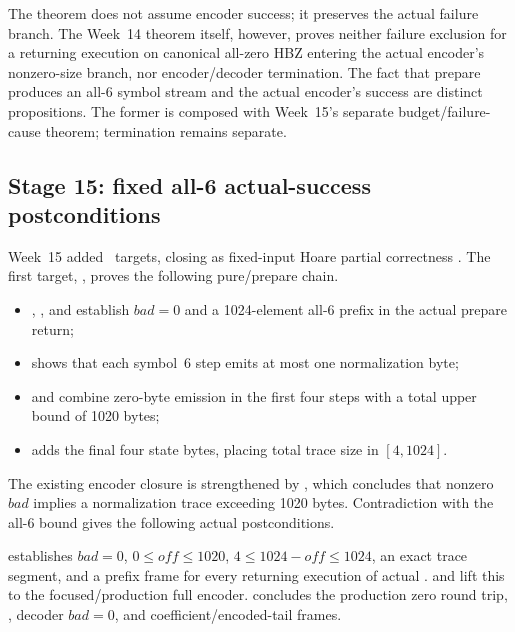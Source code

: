 The theorem does not assume encoder success; it preserves the actual failure
branch. The Week~14 theorem itself, however, proves neither failure exclusion
for a returning execution on canonical all-zero HBZ entering the actual
encoder's nonzero-size branch, nor encoder/decoder termination.
The fact that prepare produces an all-6 symbol stream and the actual encoder's
success are distinct propositions.
The former is composed with Week~15's separate budget/failure-cause theorem;
termination remains separate.

\subsection{Stage 15: fixed all-6 actual-success postconditions}

Week~15 added \WeekFifteenTargetCount\ targets, closing
 as fixed-input Hoare partial
correctness \cite{week15-report,rans-actual-success-witness}.
The first target, , proves the following
pure/prepare chain.

\begin{itemize}
  \item {}, , and
         establish \(bad=0\)
        and a 1024-element all-6 prefix in the actual prepare return;
  \item {} shows that each symbol~6
        step emits at most one normalization byte;
  \item {} and
         combine zero-byte emission
        in the first four steps with a total upper bound of 1020 bytes;
  \item {} adds the final four state bytes,
        placing total trace size in \([4,1024]\).
\end{itemize}

The existing encoder closure is strengthened by
, which concludes that
nonzero \(bad\) implies a normalization trace exceeding 1020 bytes.
Contradiction with the all-6 bound gives the following actual postconditions.

\begin{verified}
 establishes \(bad=0\),
\(0\le off\le1020\), \(4\le1024-off\le1024\), an exact trace segment,
and a prefix frame for every returning execution of actual
.
 and
 lift this to the
focused/production full encoder.
 concludes the
production zero round trip, , decoder \(bad=0\),
and coefficient/encoded-tail frames.
\end{verified}

